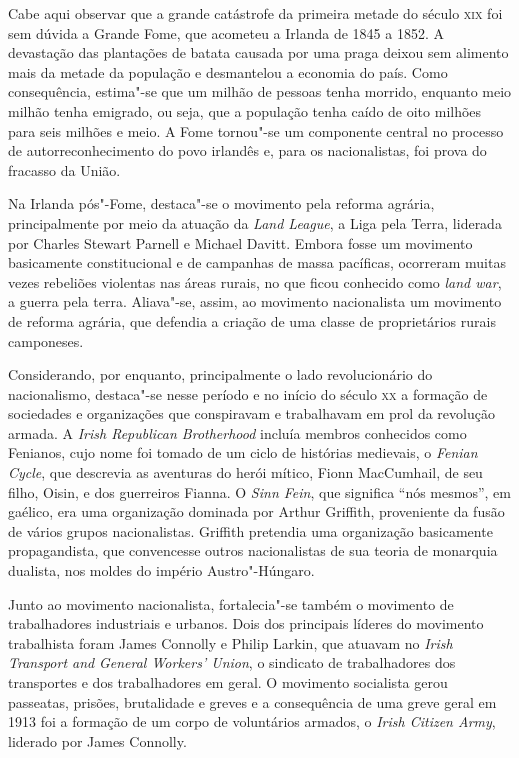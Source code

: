 Cabe aqui observar que a grande catástrofe da primeira metade do século
\textsc{xix} foi sem dúvida a Grande Fome, que acometeu a Irlanda de 1845 a
1852. A devastação das plantações de batata causada por uma praga
deixou sem alimento mais da metade da população e desmantelou a
economia do país. Como consequência, estima"-se que um milhão de pessoas
tenha morrido, enquanto meio milhão tenha emigrado, ou seja, que a
população tenha caído de oito milhões para seis milhões e meio. A Fome
tornou"-se um componente central no processo de autorreconhecimento do
povo irlandês e, para os nacionalistas, foi prova do fracasso da União.

Na Irlanda pós"-Fome, destaca"-se o movimento pela reforma agrária,
principalmente por meio da atuação da \textit{Land League}, a Liga pela
Terra, liderada por Charles Stewart Parnell e Michael Davitt. Embora
fosse um movimento basicamente constitucional e de campanhas de massa
pacíficas, ocorreram muitas vezes rebeliões violentas nas áreas rurais,
no que ficou conhecido como \textit{land war}, a guerra pela
terra.  Aliava"-se, assim, ao movimento nacionalista um
movimento de reforma agrária, que defendia a criação de uma classe de
proprietários rurais camponeses.  

Considerando, por enquanto, principalmente o lado revolucionário do
nacionalismo, destaca"-se nesse período e no início do século \textsc{xx} a
formação de sociedades e organizações que conspiravam e trabalhavam em
prol da revolução armada. A \textit{Irish Republican Brotherhood}
incluía membros conhecidos como Fenianos, cujo nome foi tomado de um
ciclo de histórias medievais, o \textit{Fenian Cycle}, que descrevia as
aventuras do herói mítico, Fionn MacCumhail, de seu filho, Oisin, e dos
guerreiros Fianna. O \textit{Sinn Fein}, que significa
``nós mesmos'', em gaélico, era uma organização dominada por Arthur
Griffith, proveniente da fusão de vários grupos nacionalistas. Griffith
pretendia uma organização basicamente propagandista, que convencesse
outros nacionalistas de sua teoria de monarquia dualista, nos moldes do
império Austro"-Húngaro.  

Junto ao movimento nacionalista, fortalecia"-se também o movimento de
trabalhadores industriais e urbanos. Dois dos principais líderes do
movimento trabalhista foram James Connolly e Philip Larkin, que atuavam
no \textit{Irish Transport and} \textit{General Workers’ Union}, o
sindicato de trabalhadores dos transportes e dos trabalhadores em geral. O movimento
socialista gerou passeatas, prisões, brutalidade e greves e a
consequência de uma greve geral em 1913 foi a formação de um corpo de
voluntários armados, o \textit{Irish Citizen Army}, liderado por James
Connolly.

